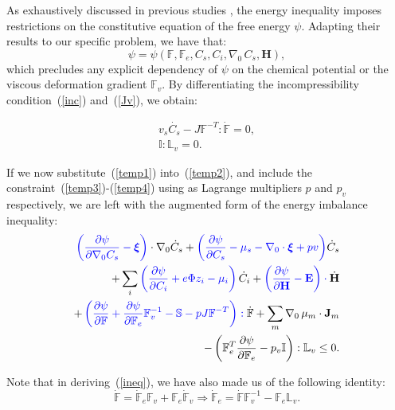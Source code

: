 \documentclass[runningheads]{llncs}
\newcommand{\F}{\ensuremath{\mathbb{F}}}
\newcommand{\LL}{\ensuremath{\mathbb{L}}}
\begin{document}
As exhaustively discussed in previous studies \cite{Plasto,GURTIN}, the energy inequality imposes restrictions on the constitutive equation of the free energy $\psi$. Adapting their results to our specific problem, we have that:
\begin{equation}
\psi = \psi (\F,\F_e, C_s, C_i, \nabla_0 \,C_s,\mathbf{H}), \label{temp1}
\end{equation}
which precludes any explicit dependency of $\psi$ on the chemical potential or the viscous deformation gradient $\F_v$. By differentiating the incompressibility condition~(\ref{inc}) and~(\ref{Jv}), we obtain:

\begin{gather}
v_s\dot{C_s} - J \F^{-T}:\dot{\F} =0, \label{temp3}\\
\mathbb{I}:\LL_v=0. \label{temp4}
\end{gather}

If we now substitute~(\ref{temp1}) into~(\ref{temp2}), and include the constraint~(\ref{temp3})-(\ref{temp4}) using as Lagrange multipliers $p$ and $p_v$ respectively, we are left with the augmented form of the energy imbalance inequality:
\begin{equation}
\begin{aligned}
\color{blue}{\left(\frac{\partial \psi}{\partial \nabla_0 C_s}-\boldsymbol{\xi}\right)} \color{black}\cdot \nabla_0 \dot{C}_s + \color{blue}{\left(\frac{\partial \psi}{\partial C_s}-\mu_s-\nabla_0 \cdot \boldsymbol{\xi}+p v\right)}\color{black}\dot{C}_s\\
+ \sum_i\color{blue}\left(\frac{\partial \psi}{\partial C_i} + e\Phi z_i-\mu_i\right) \color{black}\dot{C}_i +\color{blue}\left(\frac{\partial \psi}{\partial \mathbf{H}}-\mathbf{E}\right) \cdot \color{black}\dot{\mathbf{H}}\\
+ \color{blue} \left(\frac{\partial \psi}{\partial \F} + \frac{\partial \psi}{\partial\F_e}\F_v^{-1}- \mathbb{S} - p J \F^{-T}\right): \color{black}\dot{\F}+ \sum_m \nabla_0 \,\mu_m \cdot \mathbf{J}_m \\
- \left(\F_e^T\frac{\partial \psi}{\partial \F_e}-p_v\mathbb{I}\right):\mathbb{L}_v\leq 0 . \label{ineq}
\end{aligned}
\end{equation}

Note that in deriving~(\ref{ineq}), we have also made us of the following identity:
\begin{equation}
\dot{\F}=\dot{\F}_e\F_v+\F_e\dot{\F}_v \Longrightarrow \dot{\F}_e=\dot{\F}\F_v^{-1}-\F_e \LL_v.
\end{equation}
\end{document}
